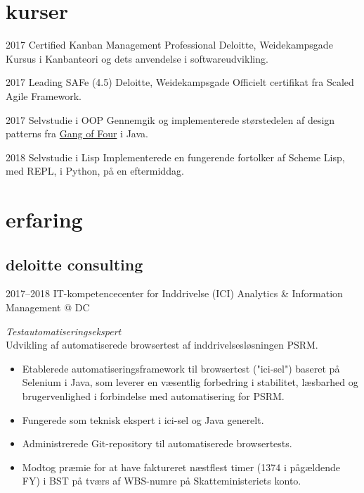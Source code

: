 \documentclass[]{../friggeri-cv} %
\begin{document}
\section{kurser}
\begin{entrylist}


\entry
{2017}
{Certified Kanban Management Professional}
{Deloitte, Weidekampsgade}
{Kursus i Kanbanteori og dets anvendelse i softwareudvikling.}

\entry
{2017}
{Leading SAFe (4.5)}
{Deloitte, Weidekampsgade}
{Officielt certifikat fra Scaled Agile Framework.}

\entry
{2017}
{Selvstudie {\normalfont i OOP}}
{}
{Gennemgik og implementerede størstedelen af design patterns fra \href{https://books.google.dk/books?id=6oHuKQe3TjQC}{Gang of Four} i Java.}


\entry
{2018}
{Selvstudie {\normalfont i Lisp}}
{}
{Implementerede en fungerende fortolker af Scheme Lisp, med REPL, i Python, på en eftermiddag.}

\end{entrylist}


\section{erfaring}

\subsection{deloitte consulting}

\begin{entrylist}
\entry
{2017--2018}
{IT-kompetencecenter for Inddrivelse (ICI)}
{Analytics \& Information Management @ DC}
{\emph{Testautomatiseringsekspert}\\
Udvikling af automatiserede browsertest af inddrivelsesløsningen PSRM. 
\begin{itemize}
\item Etablerede automatiseringsframework til browsertest ("ici-sel") baseret på Selenium i Java, som leverer en væsentlig forbedring i stabilitet, læsbarhed og brugervenlighed i forbindelse med automatisering for PSRM. 
\item Fungerede som teknisk ekspert i ici-sel og Java generelt. 
\item Administrerede Git-repository til automatiserede browsertests. 
\item Modtog præmie for at have faktureret næstflest timer (1374 i pågældende FY) i BST på tværs af WBS-numre på Skatteministeriets konto.
\end{itemize}
}

\end{entrylist}
\end{document}
